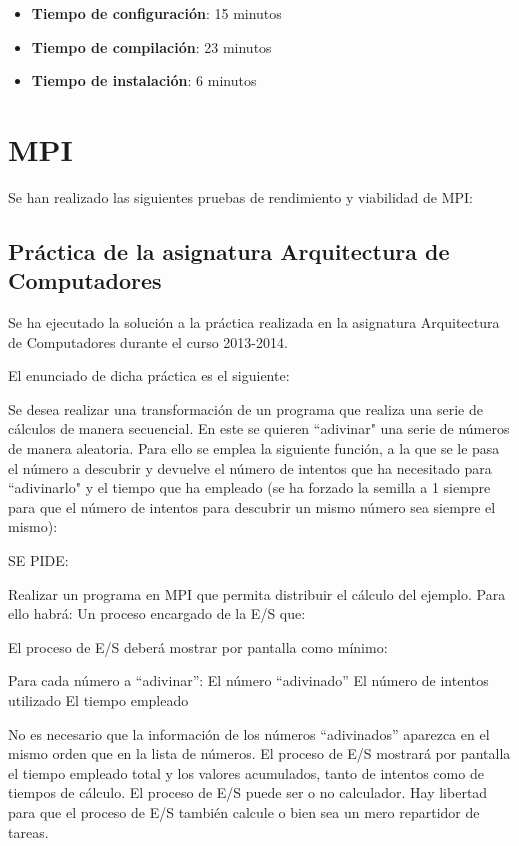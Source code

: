 \documentclass{article}
\begin{document}
\texttt{}
\begin{itemize}
\item \textbf{Tiempo de configuración}: 15 minutos
\item \textbf{Tiempo de compilación}: 23 minutos
\item \textbf{Tiempo de instalación}: 6 minutos
\end{itemize}

\section{MPI}

Se han realizado las siguientes pruebas de rendimiento y viabilidad de MPI:

\subsection{Práctica de la asignatura Arquitectura de Computadores}

Se ha ejecutado la solución a la práctica realizada en la asignatura Arquitectura de Computadores durante el curso 2013-2014.

El enunciado de dicha práctica es el siguiente:

Se desea realizar una transformación de un programa que realiza una serie de cálculos de manera secuencial. En este se quieren ``adivinar" una serie de números de manera aleatoria. Para ello se emplea la siguiente función, a la que se le pasa el número a descubrir y devuelve el número de intentos que ha necesitado para ``adivinarlo" y el tiempo que ha empleado (se ha forzado la semilla a 1 siempre para que el número de intentos para descubrir un mismo número sea siempre el mismo):

SE PIDE: 

Realizar un programa en MPI que permita distribuir el cálculo del ejemplo. Para ello habrá: 
	Un proceso encargado de la E/S que: 

		El proceso de E/S deberá mostrar por pantalla como mínimo: 

			Para cada número a ``adivinar'':
				El número ``adivinado''
				El número de intentos utilizado
				El tiempo empleado

			No es necesario que la información de los números “adivinados” aparezca en el mismo orden que en la lista de números.
		El proceso de E/S mostrará por pantalla el tiempo empleado total y los valores acumulados, tanto de intentos como de tiempos de cálculo. 
		El proceso de E/S puede ser o no calculador. Hay libertad para que el proceso de E/S también calcule o bien sea un mero repartidor de tareas. 
\end{document}
